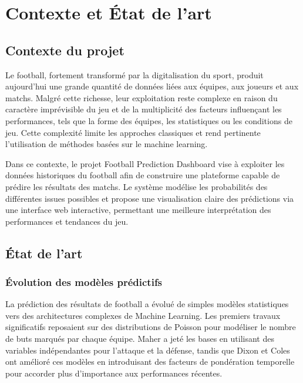 \chapter{Contexte et État de l'art}

\section{Contexte du projet}

Le football, fortement transformé par la digitalisation du sport, produit aujourd’hui une grande quantité de données liées aux équipes, aux joueurs et aux matchs. Malgré cette richesse, leur exploitation reste complexe en raison du caractère imprévisible du jeu et de la multiplicité des facteurs influençant les performances, tels que la forme des équipes, les statistiques ou les conditions de jeu. Cette complexité limite les approches classiques et rend pertinente l’utilisation de méthodes basées sur le machine learning.

Dans ce contexte, le projet Football Prediction Dashboard vise à exploiter les données historiques du football afin de construire une plateforme capable de prédire les résultats des matchs. Le système modélise les probabilités des différentes issues possibles et propose une visualisation claire des prédictions via une interface web interactive, permettant une meilleure interprétation des performances et tendances du jeu.

\section{État de l'art}

\subsection{Évolution des modèles prédictifs}
La prédiction des résultats de football a évolué de simples modèles statistiques vers des architectures complexes de Machine Learning. Les premiers travaux significatifs reposaient sur des distributions de Poisson pour modéliser le nombre de buts marqués par chaque équipe. Maher \cite{maher1982} a jeté les bases en utilisant des variables indépendantes pour l'attaque et la défense, tandis que Dixon et Coles \cite{dixon1997} ont amélioré ces modèles en introduisant des facteurs de pondération temporelle pour accorder plus d'importance aux performances récentes.

